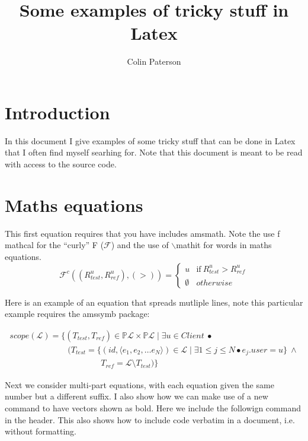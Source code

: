 \documentclass{article}
\title{Some examples of tricky stuff in Latex}
\author{Colin Paterson }
\begin{document}
\maketitle

\section{Introduction}

In this document I give examples of some tricky stuff that can be done in Latex that I often find myself searhing for. Note that this document is meant to be read with access to the source code.


\section{Maths equations}

This first equation requires that you have includes amsmath. Note the use f mathcal for the ``curly'' F ($\mathcal{F}$) and the use of $\backslash$\textsf{mathit} for words in maths equations.
\begin{equation}
\mathcal{F}^c((R^u_\mathit{test}, R^u_\mathit{ref}), (>)) = \begin{cases}
 {u} & \text{if}~ R^u_\mathit{test}>R^u_\mathit{ref}\\
  \emptyset & otherwise
\end{cases}
\end{equation}


Here is an example of an equation that spreads mutliple lines, note this particular example requires the amssymb package:

\begin{equation}
\begin{array}{l}
\mathit{scope}(\mathcal{L}) = \bigl\{(T_\mathit{test},T_\mathit{ref})\in \mathbb{P}\mathcal{L}\!\times\! \mathbb{P}\mathcal{L} \mid
\exists u\!\in\! \mathit{Client}\: \bullet\\
\qquad\qquad\qquad\quad \bigl(T_\mathit{test} = \{ (\mathit{id},\langle e_1, e_2, \ldots e_N \rangle)\!\in\! \mathcal{L} \mid \exists 1\leq j\leq N \bullet e_j.\mathit{user}=u\} \: \wedge \\
\qquad\qquad\qquad\qquad\qquad\quad T_\mathit{ref} = \mathcal{L}\setminus T_\mathit{test}\bigr)\bigr\}
\end{array}
\end{equation}

Next we consider multi-part equations, with each equation given the same number but a different suffix. I also show how we can make use of a new command to have vectors shown as bold. Here we include the followign command in the header. This also shows how to include code verbatim in a document, i.e. without formatting.
\end{document}
